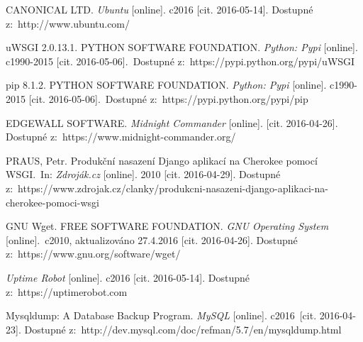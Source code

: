 \begin{thebibliography}{1}
CANONICAL LTD. \textit{Ubuntu} [online]. c2016 [cit. 2016-05-14]. Dostupné z:~http://www.ubuntu.com/

uWSGI 2.0.13.1. PYTHON SOFTWARE FOUNDATION. \textit{Python: Pypi} [online]. c1990-2015 [cit. 2016-05-06].\
Dostupné z:~https://pypi.python.org/pypi/uWSGI

pip 8.1.2. PYTHON SOFTWARE FOUNDATION. \textit{Python: Pypi} [online]. c1990-2015 [cit. 2016-05-06].\
Dostupné z:~https://pypi.python.org/pypi/pip

EDGEWALL SOFTWARE. \textit{Midnight Commander} [online]. [cit. 2016-04-26]. Dostupné z:~https://www.midnight-commander.org/

\bibitem{uwsgi}
PRAUS, Petr. Produkční nasazení Django aplikací na Cherokee pomocí WSGI.\
In: \textit{Zdroják.cz} [online]. 2010 [cit. 2016-04-29]. Dostupné z:\
https://www.zdrojak.cz/clanky/produkcni-nasazeni-django-aplikaci-na-cherokee-pomoci-wsgi

\bibitem{wget}
GNU Wget. FREE SOFTWARE FOUNDATION. \textit{GNU Operating System} [online].\
c2010, aktualizováno 27.4.2016 [cit. 2016-04-26]. Dostupné z:~https://www.gnu.org/software/wget/

\textit{Uptime Robot} [online]. c2016 [cit. 2016-05-14]. Dostupné z:~https://uptimerobot.com

\bibitem{mysqldump}
Mysqldump: A Database Backup Program. \textit{MySQL} [online]. c2016\
[cit. 2016-04-23]. Dostupné z:~http://dev.mysql.com/doc/refman/5.7/en/mysqldump.html

\end{thebibliography}